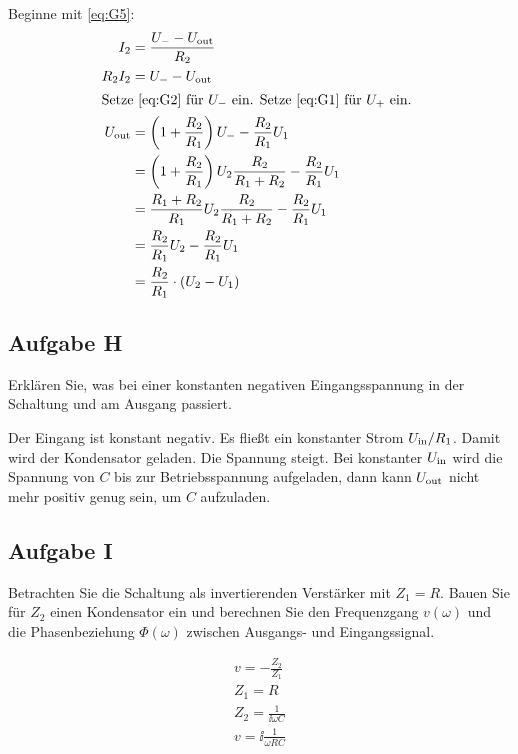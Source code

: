 Beginne mit \eqref{eq:G5}:
\begin{align*}
	I_2 &= \frac{U_- - \Uout}{R_2} \\
	R_2 I_2 &= U_- - \Uout \\
	\intertext{%
		Setze \eqref{eq:G2} für $U_-$ ein. Setze \eqref{eq:G1} für $U_+$ ein.
	}
	\Uout
	&= \del{1 + \frac{R_2}{R_1}} U_- - \frac{R_2}{R_1} U_1 \\
	&= \del{1 + \frac{R_2}{R_1}} U_2 \frac{R_2}{R_1 + R_2} - \frac{R_2}{R_1} U_1 \\
	&= \frac{R_1 + R_2}{R_1} U_2 \frac{R_2}{R_1 + R_2} - \frac{R_2}{R_1} U_1 \\
	&= \frac{R_2}{R_1} U_2 - \frac{R_2}{R_1} U_1 \\
	&= \frac{R_2}{R_1} \cdot (U_2 - U_1)
\end{align*}

\subsection{Aufgabe H}

\begin{problem}
	Erklären Sie, was bei einer konstanten negativen Eingangsspannung in der
	Schaltung und am Ausgang passiert.
\end{problem}

Der Eingang ist konstant negativ. Es fließt ein konstanter Strom $U_\text{in}/R_1$.
Damit wird der Kondensator geladen. Die Spannung steigt. Bei konstanter $U_\text{in}$
wird die Spannung von $C$ bis zur Betriebsspannung aufgeladen, dann kann
$U_\text{out}$ nicht mehr positiv genug sein, um $C$ aufzuladen.

\subsection{Aufgabe I}

\begin{problem}
	Betrachten Sie die Schaltung als invertierenden Verstärker mit $Z_1 = R$.
	Bauen Sie für $Z_2$ einen Kondensator ein und berechnen Sie den
	Frequenzgang $v(\omega)$ und die Phasenbeziehung $\Phi(\omega)$ zwischen
	Ausgangs- und Eingangssignal.
\end{problem}

\begin{gather*}
	v = - \frac{Z_2}{Z_1} \\
	Z_1 = R \\
	Z_2 = \frac{1}{\ii \omega C} \\
	v = \ii \frac{1}{\omega RC}
\end{gather*}

